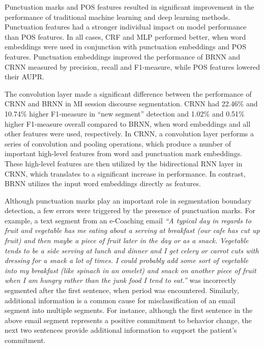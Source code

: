 \documentclass{amia}
\begin{document}
Punctuation marks and POS features resulted in significant improvement in the performance of traditional machine learning and deep learning methods. Punctuation features had a stronger individual impact on model performance than POS features. In all cases, CRF and MLP performed better, when word embeddings were used in conjunction with punctuation embeddings and POS features. Punctuation embeddings improved the performance of BRNN and CRNN measured by precision, recall and F1-measure, while POS features lowered their AUPR. %

The convolution layer made a significant difference between the performance of CRNN and BRNN in MI session discourse segmentation. CRNN had 22.46\% and 10.74\% higher F1-measure in ``new segment'' detection and 1.02\% and 0.51\% higher F1-measure overall compared to BRNN, when word embeddings and all other features were used, respectively. In CRNN, a convolution layer performs a series of convolution and pooling operations, which produce a number of important high-level features from word and punctuation mark embeddings. These high-level features are then utilized by the bidirectional RNN layer in CRNN, which translates to a significant increase in performance. In contrast, BRNN utilizes the input word embeddings directly as features.     

Although punctuation marks play an important role in segmentation boundary detection, a few errors were triggered by the presence of punctuation marks. For example, a text segment from an e-Coaching email \textit{``A typical day in regards to fruit and vegetable has me eating about a serving at breakfast (our cafe has cut up fruit) and then maybe a piece of fruit later in the day or as a snack. Vegetable tends to be a side serving at lunch and dinner and I get celery or carrot cuts with dressing for a snack a lot of times. I could probably add some sort of vegetable into my breakfast (like spinach in an omelet) and snack on another piece of fruit when I am hungry rather than the junk food I tend to eat.''} was incorrectly segmented after the first sentence, when period was encountered. Similarly, additional information is a common cause for misclassification of an email segment into multiple segments. For instance, although the first sentence in the above email segment represents a positive commitment to behavior change, the next two sentences provide additional information to support the patient's commitment. 
\end{document}
